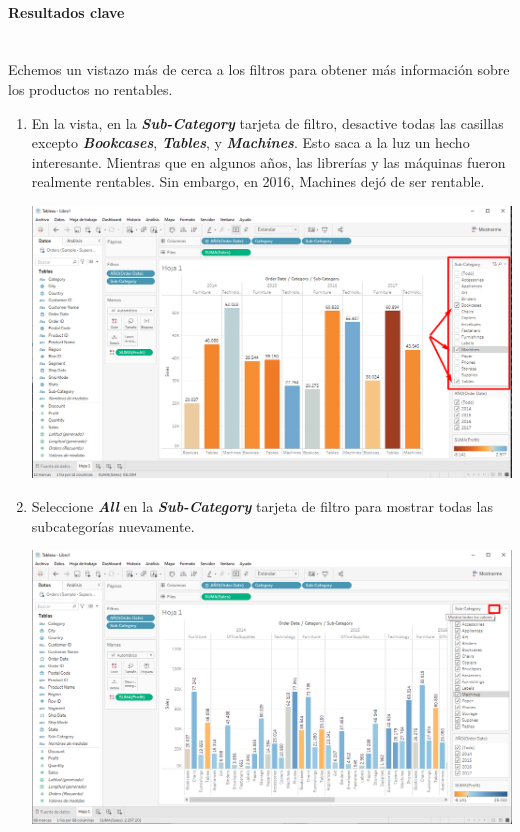 \documentclass[12pt,letterpaper]{article}
\newcommand\tab[1][1cm]{\hspace*{#1}}
\begin{document}
    \paragraph{\large Resultados clave\\ \\}
    Echemos un vistazo más de cerca a los filtros para obtener más información sobre los productos no rentables.
    \begin{enumerate}[\tab 1.]
        \item En la vista, en la \textit{\textbf{Sub-Category}} tarjeta de filtro, desactive todas las casillas excepto \textit{\textbf{Bookcases}}, \textit{\textbf{Tables}}, y \textit{\textbf{Machines}}. Esto saca a la luz un hecho interesante. Mientras que en algunos años, las librerías y las máquinas fueron realmente rentables. Sin embargo, en 2016, Machines dejó de ser rentable.
        \begin{center}
            \includegraphics[width=15cm]{./img/img22.png}
        \end{center}
        \item Seleccione \textit{\textbf{All}} en la \textit{\textbf{Sub-Category}} tarjeta de filtro para mostrar todas las subcategorías nuevamente.
        \begin{center}
            \includegraphics[width=15cm]{./img/img23.png}

\end{center}
\end{enumerate}
\end{document}

